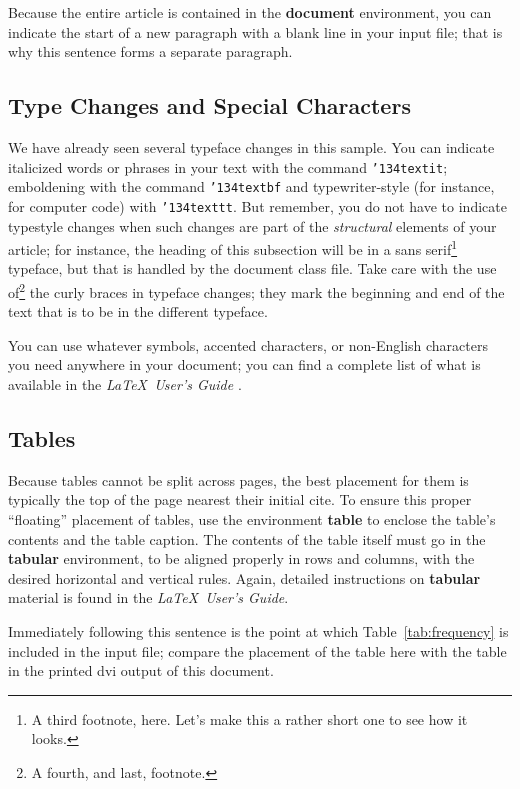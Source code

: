 \documentclass[sigconf]{nimepaper}
\begin{document}
Because the entire article is contained in
the \textbf{document} environment, you can indicate the
start of a new paragraph with a blank line in your
input file; that is why this sentence forms a separate paragraph.

\subsection{Type Changes and { Special} Characters}
We have already seen several typeface changes in this sample.  You
can indicate italicized words or phrases in your text with
the command \texttt{{\char'134}textit}; emboldening with the
command \texttt{{\char'134}textbf}
and typewriter-style (for instance, for computer code) with
\texttt{{\char'134}texttt}.  But remember, you do not
have to indicate typestyle changes when such changes are
part of the \textit{structural} elements of your
article; for instance, the heading of this subsection will
be in a sans serif\footnote{A third footnote, here.
Let's make this a rather short one to
see how it looks.} typeface, but that is handled by the
document class file. Take care with the use
of\footnote{A fourth, and last, footnote.}
the curly braces in typeface changes; they mark
the beginning and end of
the text that is to be in the different typeface.

You can use whatever symbols, accented characters, or
non-English characters you need anywhere in your document;
you can find a complete list of what is
available in the \textit{\LaTeX\
User's Guide} \cite{Lamport:LaTeX}.


\subsection{Tables}
Because tables cannot be split across pages, the best
placement for them is typically the top of the page
nearest their initial cite.  To
ensure this proper ``floating'' placement of tables, use the
environment \textbf{table} to enclose the table's contents and
the table caption.  The contents of the table itself must go
in the \textbf{tabular} environment, to
be aligned properly in rows and columns, with the desired
horizontal and vertical rules.  Again, detailed instructions
on \textbf{tabular} material
is found in the \textit{\LaTeX\ User's Guide}.

Immediately following this sentence is the point at which
Table~\ref{tab:frequency} is included in the input file; compare the
placement of the table here with the table in the printed
dvi output of this document. 
\end{document}
